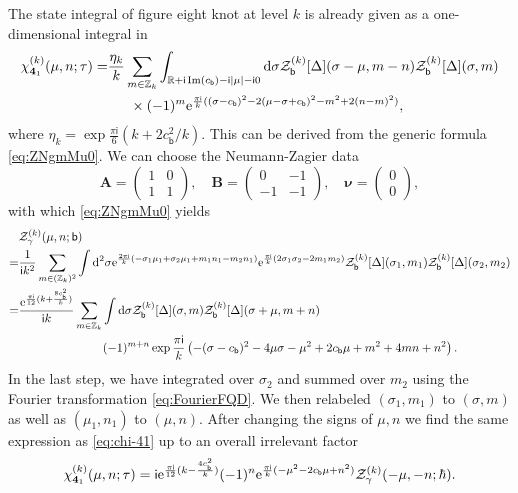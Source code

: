 \documentclass[a4paper,11pt]{article}	%
\DeclareMathOperator{\imag}{Im}
\def\mc{\mathcal}
\def\md{\mathbf}
\def\ms{\mathsf}
\newcommand{\bs}[1]{\boldsymbol{#1}}
\def\IR{\mathbb{R}}
\def\IZ{\mathbb{Z}}
\newcommand{\re}{{\rm e}}
\newcommand{\ri}{{\mathsf{i}}}
\newcommand{\rd}{{\rm d}}
\newcommand{\nn}{\nonumber \\}
\newcommand{\bb}{\ms{b}}
\newcommand{\knot}[1]{\md{#1}}
\begin{document}
The state integral of figure eight knot at level $k$ is already given
as a one-dimensional integral in \cite{Andersen:2016ugz}
\begin{align}
  \chi^{(k)}_{\knot{4}_1}(\mu,n;\tau) =
  &\frac{\eta_k}{k}\sum_{m\in \IZ_k}\int_{\IR+\ri\imag(c_\bb)-\ri|\mu|-\ri 0}\rd \sigma
    \mc{Z}^{(k)}_\bb[\Delta](\sigma-\mu,m-n)
    \mc{Z}^{(k)}_\bb[\Delta](\sigma,m)\nn
  &\phantom{==}\times(-1)^m
    \re^{\frac{\pi\ri}{k}((\sigma-c_\bb)^2-2(\mu-\sigma+c_\bb)^2-m^2+2(n-m)^2)},
      \label{eq:chi-41}
\end{align}
where $\eta_k = \exp \frac{\pi\ri}{6}(k+2 c_\bb^2/k)$.
This can be derived from the generic formula \eqref{eq:ZNgmMu0}.
We can choose the Neumann-Zagier data
\begin{equation}
  \pmb{A} =
  \begin{pmatrix}
    1&0\\1&1
  \end{pmatrix},\quad
  \pmb{B} =
  \begin{pmatrix}
    0&-1\\-1&-1
  \end{pmatrix},\quad
  \bs\nu =
  \begin{pmatrix}
    0\\0
  \end{pmatrix},
\end{equation}
with which \eqref{eq:ZNgmMu0} yields
\begin{align}
  &\mc{Z}_\gamma^{(k)}(\mu,n;\bb)\nn =
  &\frac{1}{\ri k^2}\sum_{m\in (\IZ_k)^2}\int \rd^2\sigma
    \re^{\frac{2\pi\ri}{k}(-\sigma_1\mu_1+\sigma_2\mu_1+m_1n_1-m_2n_1)}
    \re^{\frac{\pi\ri}{k}(2\sigma_1\sigma_2-2m_1m_2)}
    \mc{Z}_\bb^{(k)}[\Delta](\sigma_1,m_1)
    \mc{Z}_\bb^{(k)}[\Delta](\sigma_2,m_2) \nn=
  &\frac{\re^{\frac{\pi\ri}{12}(k+\frac{8c_\bb^2}{k})}}{\ri k}
    \sum_{m\in\IZ_k}
    \int\rd \sigma
    \mc{Z}_\bb^{(k)}[\Delta](\sigma,m)
    \mc{Z}_\bb^{(k)}[\Delta](\sigma+\mu,m+n)\nn
  &\phantom{=========}
    (-1)^{m+n}
    \exp\frac{\pi\ri}{k}\left(
    -(\sigma-c_\bb)^2-4\mu\sigma-\mu^2+2c_\bb\mu+m^2+4mn+n^2
    \right).
\end{align}
In the last step, we have integrated over $\sigma_2$ and summed
over $m_2$ using the Fourier transformation \eqref{eq:FourierFQD}.
We then relabeled $(\sigma_1,m_1)$ to $(\sigma,m)$ as well as
$(\mu_1,n_1)$ to $(\mu,n)$.  After changing the signs of $\mu,n$ we
find the same expression as \eqref{eq:chi-41} up to an overall
irrelevant factor
\begin{equation}
  \chi^{(k)}_{\knot{4}_1}(\mu,n;\tau) = \ri
  \re^{\frac{\pi\ri}{12}(k-\frac{4c_{\bb}^2}{k})}(-1)^n
  \re^{\frac{\pi\ri}{k}(-\mu^2-2c_\bb\mu+n^2)}
  \mc{Z}_{\gamma}^{(k)}(-\mu,-n;\hbar).
\end{equation}
\end{document}
